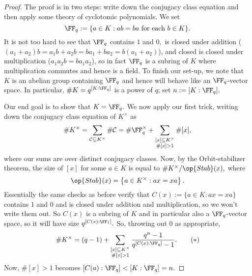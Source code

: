 \begin{proof}
	The proof is in two steps: write down the conjugacy class equation and then apply some theory of cyclotomic polynomials.
	We set
	\[\FF_q:=\{a\in K:ab=ba\text{ for each }b\in K\}.\]
	It is not too hard to see that $\FF_q$ contains $1$ and $0,$ is closed under addition ($(a_1+a_2)b=a_1b+a_2b=ba_1+ba_2=b(a_1+a_2)$), and closed is closed under multiplication ($a_1a_2b=ba_1a_2$), so in fact $\FF_q$ is a subring of $K$ where multiplication commutes and hence is a field. To finish our set-up, we note that $K$ is an abelian group containing $\FF_q$ and hence will behave like an $\FF_q$-vector space. In particular, $\#K=q^{[K:\FF_q]}$ is a power of $q$; set $n:=[K:\FF_q].$

	Our end goal is to show that $K=\FF_q.$ We now apply our first trick, writing down the conjugacy class equation of $K^\times$ as
	\[\#K^\times=\sum_{\mathcal C\subseteq K^\times}\#\mathcal C=\#\FF_q^\times+\sum_{\substack{[x]\subseteq K^\times\\\#[x]>1}}\#[x],\]
	where our sums are over distinct conjugacy classes. Now, by the Orbit-stabilizer theorem, the size of $[x]$ for some $a\in K$ is equal to $\#K^\times/\op{Stab}(x),$ where
	\[\op{Stab}(x)=\left\{a\in K^\times:ax=xa\right\}.\]
	Essentially the same checks as before verify that $C(x):=\{a\in K:ax=xa\}$ contains $1$ and $0$ and is closed under addition and multiplication, so we won't write them out. So $C(x)$ is a subring of $K$ and in particular also a $\FF_q$-vector space, so it will have size $q^{[C(x):\FF_1]}.$ So, throwing out $0$ as appropriate,
	\[\#K^\times=(q-1)+\sum_{\substack{[x]\subseteq K^\times\\\#[x]>1}}\frac{q^n-1}{q^{[C(x):\FF_q]}-1}.\tag{$*$}\]
	Now, $\#[x]>1$ becomes $[C(a):\FF_q]<[K:\FF_q]=n.$


\end{proof}
